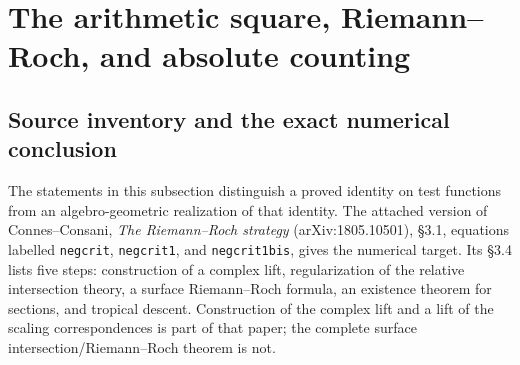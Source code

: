 \section{The arithmetic square, Riemann--Roch, and absolute counting}
\label{sec:sites-twistor}

\subsection{Source inventory and the exact numerical conclusion}

The statements in this subsection distinguish a proved identity on test
functions from an algebro-geometric realization of that identity.  The
attached version of Connes--Consani, \emph{The Riemann--Roch strategy}
(arXiv:1805.10501), \S3.1, equations labelled \texttt{negcrit},
\texttt{negcrit1}, and \texttt{negcrit1bis}, gives the numerical target.
Its \S3.4 lists five steps: construction of a complex lift, regularization
of the relative intersection theory, a surface Riemann--Roch formula,
an existence theorem for sections, and tropical descent.  Construction of
the complex lift and a lift of the scaling correspondences is part of that
paper; the complete surface intersection/Riemann--Roch theorem is not.

